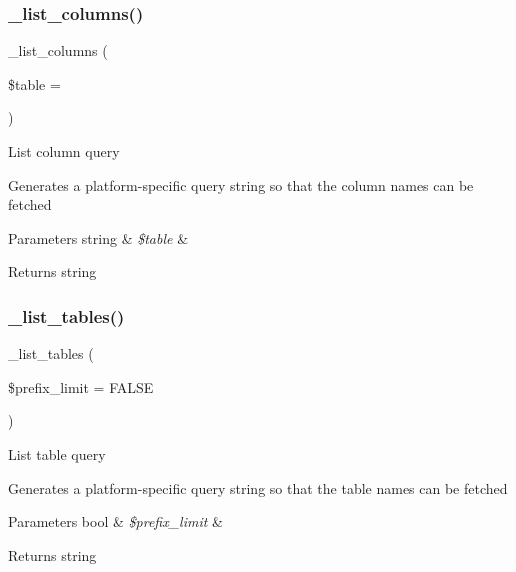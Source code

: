 \subsubsection{\texorpdfstring{\+\_\+list\+\_\+columns()}{\_list\_columns()}}
{\footnotesize\ttfamily \+\_\+list\+\_\+columns (\begin{DoxyParamCaption}\item[{}]{\$table = {\ttfamily \textquotesingle{}\textquotesingle{}} }\end{DoxyParamCaption})\hspace{0.3cm}{\ttfamily [protected]}}

List column query

Generates a platform-\/specific query string so that the column names can be fetched


\begin{DoxyParams}[1]{Parameters}
string & {\em \$table} & \\
\hline
\end{DoxyParams}
\begin{DoxyReturn}{Returns}
string 
\end{DoxyReturn}
\mbox{\label{class_c_i___d_b__mssql__driver_a435c0f3ce54fe7daa178baa8532ebd54}} 
\subsubsection{\texorpdfstring{\+\_\+list\+\_\+tables()}{\_list\_tables()}}
{\footnotesize\ttfamily \+\_\+list\+\_\+tables (\begin{DoxyParamCaption}\item[{}]{\$prefix\+\_\+limit = {\ttfamily FALSE} }\end{DoxyParamCaption})\hspace{0.3cm}{\ttfamily [protected]}}

List table query

Generates a platform-\/specific query string so that the table names can be fetched


\begin{DoxyParams}[1]{Parameters}
bool & {\em \$prefix\+\_\+limit} & \\
\hline
\end{DoxyParams}
\begin{DoxyReturn}{Returns}
string 
\end{DoxyReturn}
\mbox{\label{class_c_i___d_b__mssql__driver_ac81ac882c1d54347d810199a15856aac}} 
